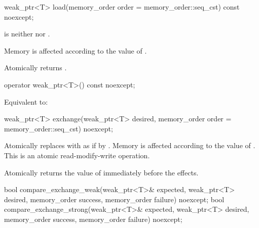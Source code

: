%
\begin{itemdecl}
weak_ptr<T> load(memory_order order = memory_order::seq_cst) const noexcept;
\end{itemdecl}

\begin{itemdescr}
\pnum
\expects
{} is neither
 nor .

\pnum
\effects
Memory is affected according to the value of .

\pnum
\returns
Atomically returns .
\end{itemdescr}

%
\begin{itemdecl}
operator weak_ptr<T>() const noexcept;
\end{itemdecl}

\begin{itemdescr}
\pnum
\effects
Equivalent to: 
\end{itemdescr}

%
\begin{itemdecl}
weak_ptr<T> exchange(weak_ptr<T> desired, memory_order order = memory_order::seq_cst) noexcept;
\end{itemdecl}

\begin{itemdescr}
\pnum
\effects
Atomically replaces  with 
as if by .
Memory is affected according to the value of .
This is an atomic read-modify-write operation.

\pnum
\returns
Atomically returns the value of  immediately before the effects.
\end{itemdescr}

%
\begin{itemdecl}
bool compare_exchange_weak(weak_ptr<T>& expected, weak_ptr<T> desired,
                           memory_order success, memory_order failure) noexcept;
bool compare_exchange_strong(weak_ptr<T>& expected, weak_ptr<T> desired,
                             memory_order success, memory_order failure) noexcept;
\end{itemdecl}

